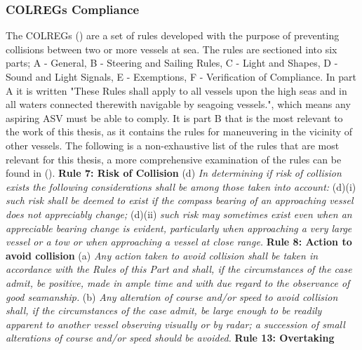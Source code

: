 \subsubsection*{COLREGs Compliance}
The \gls{COLREGs} (\cite{WikisourceCOLREGS}) are a set of rules developed with the purpose of preventing collisions between two or more vessels at sea.
The rules are sectioned into six parts; A - General, B - Steering and Sailing Rules, C - Light and Shapes, D - Sound and Light Signals, E - Exemptions,
F - Verification of Compliance. In part A it is written "These Rules shall apply to all vessels upon the high seas and in all waters connected therewith 
navigable by seagoing vessels.", which means any aspiring \gls{ASV} must be able to comply. It is part B that is the most relevant to the work of this thesis,
as it contains the rules for maneuvering in the vicinity of other vessels. The following is a non-exhaustive list of the rules that are most
relevant for this thesis, a more comprehensive examination of the rules can be found in (\cite{cockcroft2012manoeuvres}).\newline
\textbf{Rule 7: Risk of Collision}\newline
(d)\textit{ In determining if risk of collision exists the following considerations shall be among those taken into account:}\newline
(d)(i) \textit{such risk shall be deemed to exist if the compass bearing of an approaching vessel does not appreciably change;}\newline
(d)(ii) \textit{ such risk may sometimes exist even when an appreciable bearing change is evident, particularly when 
approaching a very large vessel or a tow or when approaching a vessel at close range.}\newline
\textbf{Rule 8: Action to avoid collision}\newline
(a) \textit{Any action taken to avoid collision shall be taken in accordance with the Rules of this Part and shall, 
if the circumstances of the case admit, be positive, made in ample time and with due regard to the observance of good seamanship.}\newline
(b) \textit{Any alteration of course and/or speed to avoid collision shall, if the circumstances of the case admit, be large enough to be readily 
apparent to another vessel observing visually or by radar; a succession of small alterations of course and/or speed should be avoided.}\newline
\textbf{Rule 13: Overtaking}\newline
